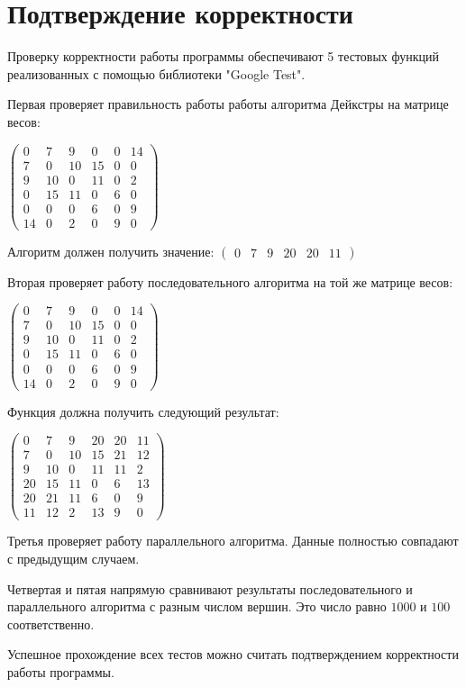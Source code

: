\documentclass{report}
\begin{document}
\newpage

\section*{Подтверждение корректности}
\par Проверку корректности работы программы обеспечивают 5 тестовых функций реализованных с помощью библиотеки "Google Test".
\par Первая проверяет правильность работы работы алгоритма Дейкстры на матрице весов:
\par
$\begin{pmatrix}
  0 & 7 & 9 & 0 & 0 & 14\\
  7 & 0 & 10 & 15 & 0 & 0\\
  9 & 10 & 0 & 11 & 0 & 2\\
  0 & 15 & 11 & 0 & 6 & 0\\
  0 & 0 & 0 & 6 & 0 & 9\\
  14 & 0 & 2 & 0 & 9 & 0
\end{pmatrix}$
\par Алгоритм должен получить значение:
$\begin{pmatrix}
 0 & 7 & 9 & 20 & 20 & 11
\end{pmatrix}$
\par Вторая проверяет работу последовательного алгоритма на той же матрице весов:
\par
$\begin{pmatrix}
  0 & 7 & 9 & 0 & 0 & 14\\
  7 & 0 & 10 & 15 & 0 & 0\\
  9 & 10 & 0 & 11 & 0 & 2\\
  0 & 15 & 11 & 0 & 6 & 0\\
  0 & 0 & 0 & 6 & 0 & 9\\
  14 & 0 & 2 & 0 & 9 & 0
\end{pmatrix}$
\par Функция должна получить следующий результат:
\par
$\begin{pmatrix}
 0 & 7 & 9 & 20 & 20 & 11\\
 7 & 0 &  10 & 15 & 21 & 12\\
 9 & 10 & 0 & 11 & 11 & 2\\
 20 & 15 & 11 & 0 & 6 & 13\\
 20 & 21 & 11 & 6 & 0 & 9\\
 11 & 12 & 2 & 13 & 9 & 0
\end{pmatrix}$
\par Третья проверяет работу параллельного алгоритма. Данные полностью совпадают с предыдущим случаем.
\par Четвертая и пятая напрямую сравнивают результаты последовательного и параллельного алгоритма с разным числом вершин. Это число равно $1000$ и $100$ соответственно.
\par Успешное прохождение всех тестов можно считать подтверждением корректности работы программы.
\end{document}
